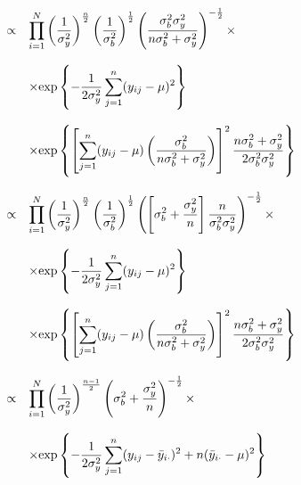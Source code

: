 \documentclass{asaproc}
\begin{document}
\begin{small}
\begin{eqnarray*}
\begin{array}{lcl ll }


& \propto & \displaystyle\prod_{i=1}^{N}\left(\dfrac{1}{\sigma_y^2}\right)^{\frac{n}{2}} \left(\dfrac{1}{\sigma_b^2}\right)^{\frac{1}{2}} \left(\dfrac{\sigma_b^2\sigma_y^2}{n\sigma_b^2 + \sigma_y^2}\right)^{-\frac{1}{2}}  \times \\ \\

& & \times \mbox{exp}\left\{ -\dfrac{1}{2\sigma_y^2}\displaystyle\sum_{j=1}^{n}(y_{ij} - \mu)^2\right\} \\\\

& &\times \mbox{exp}\left\{ \left[\displaystyle\sum_{j=1}^{n}(y_{ij} -\mu)  \left(\dfrac{\sigma_b^2}{n\sigma_b^2 + \sigma_y^2}\right) \right]^2 \dfrac{n\sigma_b^2 + \sigma_y^2}{2\sigma_b^2\sigma_y^2}\right\}\\\\

& \propto & \displaystyle\prod_{i=1}^{N}\left(\dfrac{1}{\sigma_y^2}\right)^{\frac{n}{2}} \left(\dfrac{1}{\sigma_b^2}\right)^{\frac{1}{2}} 

\left( \left[\sigma_b^2 + \dfrac{\sigma_y^2}{n}\right] \dfrac{n}{\sigma_b^2 \sigma_y^2} \right)^{-\frac{1}{2}}  \times \\ \\

& & \times \mbox{exp}\left\{ -\dfrac{1}{2\sigma_y^2}\displaystyle\sum_{j=1}^{n}(y_{ij} - \mu)^2\right\} \\\\

&  & \times \mbox{exp}\left\{ \left[\displaystyle\sum_{j=1}^{n}(y_{ij} -\mu)  \left(\dfrac{\sigma_b^2}{n\sigma_b^2 + \sigma_y^2}\right) \right]^2 \dfrac{n\sigma_b^2 + \sigma_y^2}{2\sigma_b^2\sigma_y^2}\right\}\\\\

& \propto & \displaystyle\prod_{i=1}^{N}\left(\dfrac{1}{\sigma_y^2}\right)^{\frac{n-1}{2}} 

\left(\sigma_b^2 + \dfrac{\sigma_y^2}{n}\right)^{-\frac{1}{2}}  \times \\ \\

& & \times \mbox{exp}\left\{ -\dfrac{1}{2\sigma_y^2}\displaystyle\sum_{j=1}^{n}(y_{ij} - \bar{y}_{i\cdot})^2 + n(\bar{y}_{i\cdot}- \mu)^2\right\} \\\\


\end{array}
\end{eqnarray*}
\end{small}
\end{document}
